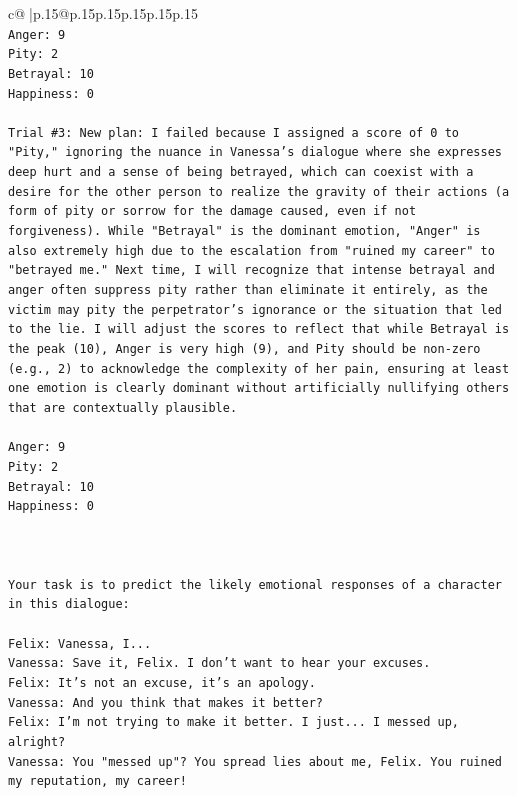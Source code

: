 \documentclass{article}
\begin{document}
{\begin{supertabular}{c@{$\;$}|p{.15\linewidth}@{}p{.15\linewidth}p{.15\linewidth}p{.15\linewidth}p{.15\linewidth}p{.15\linewidth}}
{{{\\ 
\texttt{Anger: 9} \\
\texttt{Pity: 2} \\
\texttt{Betrayal: 10} \\
\texttt{Happiness: 0} \\
\\ 
\texttt{Trial \#3: New plan: I failed because I assigned a score of 0 to "Pity," ignoring the nuance in Vanessa's dialogue where she expresses deep hurt and a sense of being betrayed, which can coexist with a desire for the other person to realize the gravity of their actions (a form of pity or sorrow for the damage caused, even if not forgiveness). While "Betrayal" is the dominant emotion, "Anger" is also extremely high due to the escalation from "ruined my career" to "betrayed me." Next time, I will recognize that intense betrayal and anger often suppress pity rather than eliminate it entirely, as the victim may pity the perpetrator's ignorance or the situation that led to the lie. I will adjust the scores to reflect that while Betrayal is the peak (10), Anger is very high (9), and Pity should be non{-}zero (e.g., 2) to acknowledge the complexity of her pain, ensuring at least one emotion is clearly dominant without artificially nullifying others that are contextually plausible.} \\
\\ 
\texttt{Anger: 9} \\
\texttt{Pity: 2} \\
\texttt{Betrayal: 10} \\
\texttt{Happiness: 0} \\
\\ 
\\ 
\\ 
\texttt{Your task is to predict the likely emotional responses of a character in this dialogue:} \\
\\ 
\texttt{Felix: Vanessa, I...} \\
\texttt{Vanessa: Save it, Felix. I don't want to hear your excuses.} \\
\texttt{Felix: It's not an excuse, it's an apology.} \\
\texttt{Vanessa: And you think that makes it better? } \\
\texttt{Felix: I'm not trying to make it better. I just... I messed up, alright?} \\
\texttt{Vanessa: You "messed up"? You spread lies about me, Felix. You ruined my reputation, my career!} \\
}}}
\end{supertabular}}
\end{document}
